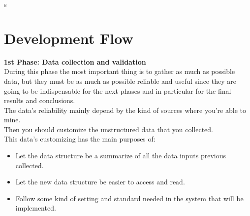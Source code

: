 s
\hypersetup{
    colorlinks=true,
    linkcolor=blue,
    filecolor=magenta,      
    urlcolor=blue,
}



\hypersetup{
    colorlinks=true,
    linkcolor=blue,
    filecolor=magenta,      
    urlcolor=blue,
}


\section{Development Flow}

\textbf{1st Phase: Data collection and validation}\\
During this phase the most important thing is to gather as much as possible data, but they must be as much as possible reliable and useful since they are going to be indispensable for the next phases and in particular for the final results and conclusions.\\
The data’s reliability mainly depend by the kind of sources where you’re able to mine.\\
Then you should customize the unstructured data that you collected.\\
This data’s customizing has the main purposes of:
\vspace{-5mm}
\begin{itemize}
 \setlength{\itemsep}{-5pt}
 \item Let the data structure be a summarize of all the data inputs previous collected.
 \item Let the new data structure be easier to access and read.
 \item Follow some kind of setting and standard needed in the system that will be implemented.
\end{itemize}


